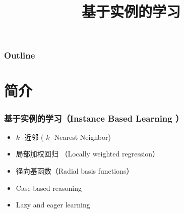 \documentclass{beamer}
\title{基于实例的学习}
\author{}
\date{}
\begin{document}
\maketitle

\begin{frame}
\frametitle{Outline}
\setcounter{tocdepth}{3}
\tableofcontents
\end{frame}







\section{简介}
\label{sec-1}
\begin{frame}
\frametitle{基于实例的学习（Instance Based Learning ）}
\label{sec-1-1}

\begin{itemize}
\item $k$ -近邻 ( $k$ -Nearest Neighbor)
\item 局部加权回归 （Locally weighted regression）
\item 径向基函数（Radial basis functions）
\item Case-based reasoning
\item Lazy and eager learning
\end{itemize}
\end{frame}
\end{document}

